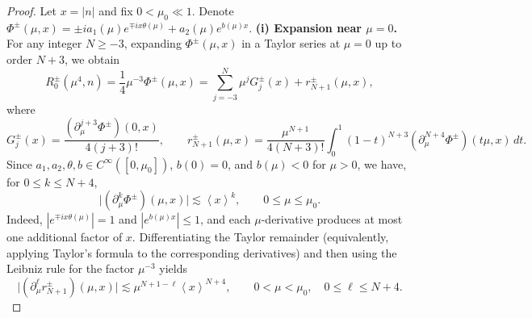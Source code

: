 \documentclass[10pt,a4paper]{amsart}
\numberwithin{equation}{section}
\begin{document}
\begin{proof}
Let $x=|n|$ and fix $0<\mu_0\ll1$. Denote $\Phi^{\pm}(\mu,x)=\pm i a_1(\mu)e^{\mp ix\theta(\mu)}+a_2(\mu)e^{b(\mu)x}$. 
\vskip0.1cm
\textbf{(i) Expansion near $\mu=0$.}
For any integer $N\geq-3$, expanding $\Phi^{\pm}(\mu,x)$ in a Taylor series at $\mu=0$ up to order $N+3$, we obtain
\[
R^{\pm}_0(\mu^4,n)=\frac{1}{4}\mu^{-3}\Phi^{\pm}(\mu,x)
=\sum_{j=-3}^{N}\mu^jG_j^{\pm}(x)+r_{N+1}^{\pm}(\mu,x),
\]
where
\[
G_j^{\pm}(x)=\frac{(\partial_\mu^{j+3}\Phi^{\pm})(0,x)}{4(j+3)!},\qquad
r_{N+1}^{\pm}(\mu,x)
=\frac{\mu^{N+1}}{4(N+3)!}\int_0^1(1-t)^{N+3}
(\partial_\mu^{N+4}\Phi^{\pm})(t\mu,x)\,dt.
\]
Since $a_1,a_2,\theta,b\in C^{\infty}([0,\mu_0])$, $b(0)=0$, and $b(\mu)<0$ for $\mu>0$, we have, for $0\leq k\leq N+4$,
\[
\bigl|(\partial_\mu^k\Phi^{\pm})(\mu,x)\bigr|\lesssim\left<x\right>^k,
\qquad 0\leq\mu\leq\mu_0.
\]
Indeed, $|e^{\mp ix\theta(\mu)}|=1$ and $|e^{b(\mu)x}|\leq1$, and each $\mu$-derivative produces at most one additional factor of $x$. Differentiating the Taylor remainder (equivalently, applying Taylor's formula to the corresponding derivatives) and then using the Leibniz rule for the factor $\mu^{-3}$ yields
\begin{equation}\label{estim for remainder r}
\bigl|(\partial_\mu^{\ell}r_{N+1}^{\pm})(\mu,x)\bigr|
\lesssim \mu^{N+1-\ell}\left<x\right>^{N+4},
\qquad 0<\mu<\mu_0,\quad 0\leq\ell\leq N+4.  
\end{equation}


\end{proof}
\end{document}

